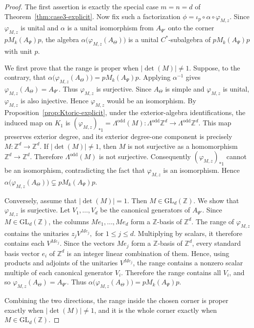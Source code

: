 \documentclass[11pt]{amsart}
\theoremstyle{definition}
\theoremstyle{remark}
\newcommand{\Z}{\mathbb{Z}}
\newcommand{\GL}{\mathrm{GL}}
\begin{document}
\begin{proof}
The first assertion is exactly the special case $m=n=d$ of
Theorem~\ref{thm:case3-explicit}. 
Now fix such a factorization $\phi=\iota_p\circ \alpha\circ \varphi_{M,z}.$
Since $\varphi_{M,z}$ is unital and $\alpha$ is a unital isomorphism from
$A_{\Psi'}$ onto the corner $pM_k(A_\Psi)p$, the algebra $\alpha\bigl(\varphi_{M,z}(A_\Theta)\bigr)$
is a unital $C^*$-subalgebra of $pM_k(A_\Psi)p$ with unit $p$.

We first prove that the range is proper when $|\det(M)|\neq 1$. Suppose, to the
contrary, that $\alpha\bigl(\varphi_{M,z}(A_\Theta)\bigr)=pM_k(A_\Psi)p.$
Applying $\alpha^{-1}$ gives $\varphi_{M,z}(A_\Theta)=A_{\Psi'}.$
Thus $\varphi_{M,z}$ is surjective. Since $A_\Theta$ is simple and
$\varphi_{M,z}$ is unital, $\varphi_{M,z}$ is also injective. Hence
$\varphi_{M,z}$ would be an isomorphism. By Proposition~\ref{prop:Ktoric-explicit}, under the exterior-algebra
identifications, the induced map on $K_1$ is
$(\varphi_{M,z})_{*1}
=\Lambda^{\mathrm{odd}}(M)\colon\Lambda^{\mathrm{odd}}\Z^d\to \Lambda^{\mathrm{odd}}\Z^d.$
This map preserves exterior degree, and its exterior degree-one component is
precisely $M\colon \Z^d\to \Z^d.$
If $|\det(M)|\neq 1$, then $M$ is not surjective as a homomorphism
$\Z^d\to\Z^d$. Therefore $\Lambda^{\mathrm{odd}}(M)$ is not surjective.
Consequently $(\varphi_{M,z})_{*1}$ cannot be an isomorphism, contradicting
the fact that $\varphi_{M,z}$ is an isomorphism. Hence $\alpha\bigl(\varphi_{M,z}(A_\Theta)\bigr)\subsetneq pM_k(A_\Psi)p.$

Conversely, assume that $|\det(M)|=1$. Then $M\in\GL_d(\Z)$. We show that
$\varphi_{M,z}$ is surjective. Let $V_1,\ldots,V_d$ be the canonical generators
of $A_{\Psi'}$. Since $M\in\GL_d(\Z)$, the columns $Me_1,\ldots,Me_d$
form a $\Z$-basis of $\Z^d$. The range of $\varphi_{M,z}$ contains the unitaries $z_jV^{Me_j},$ for $1\leq j\leq d.$
Multiplying by scalars, it therefore contains each $V^{Me_j}$. Since the
vectors $Me_j$ form a $\Z$-basis of $\Z^d$, every standard basis vector $e_i$ of $\Z^d$ is an
integer linear combination of them. Hence, using products and adjoints of the
unitaries $V^{Me_j}$, the range contains a nonzero scalar multiple of each
canonical generator $V_i$. Therefore the range contains all $V_i$, and so $\varphi_{M,z}(A_\Theta)=A_{\Psi'}.$
Thus $\alpha\bigl(\varphi_{M,z}(A_\Theta)\bigr)=pM_k(A_\Psi)p.$

Combining the two directions, the range inside the chosen corner is proper
exactly when $|\det(M)|\neq 1$, and it is the whole corner exactly when
$M\in\GL_d(\Z)$.
\end{proof}
\end{document}
